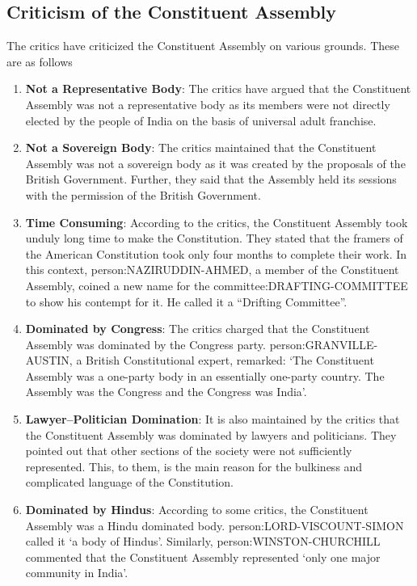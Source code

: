 \begin{multicol}{2}
\section{Criticism of the Constituent Assembly}

The critics have criticized the Constituent Assembly on various grounds. These are as follows

\begin{enumerate}
  \item \textbf{Not a Representative Body}: The critics have argued that the Constituent  Assembly was not a representative body as its members were not directly elected by the people of India on the basis of universal adult franchise.
  \item \textbf{Not a Sovereign Body}: The critics maintained that the Constituent Assembly was not a sovereign body as it was created by the proposals of the British Government. Further, they said that the Assembly held its sessions with the permission of the British Government.
  \item \textbf{Time Consuming}: According to the critics, the Constituent Assembly took unduly long time to make the Constitution. They stated that the framers of the American Constitution took only four months to complete their work. In this context, \gls{person:NAZIRUDDIN-AHMED}, a member of the Constituent Assembly, coined a new name for the \gls{committee:DRAFTING-COMMITTEE} to show his contempt for it. He called it a ``Drifting Committee''.
  \item \textbf{Dominated by Congress}: The critics charged that the Constituent Assembly was dominated by the Congress party. \gls{person:GRANVILLE-AUSTIN}, a British Constitutional expert, remarked: `The Constituent Assembly was a one-party body in an essentially one-party country. The Assembly was the Congress and the Congress was India'.
  \item \textbf{Lawyer–Politician Domination}: It is also maintained by the critics that the Constituent Assembly was dominated by lawyers and politicians. They pointed out that other sections of the society were not sufficiently represented. This, to them, is the main reason for the bulkiness and complicated language of the Constitution.
  \item \textbf{Dominated by Hindus}: According to some critics, the Constituent Assembly was a Hindu dominated body. \gls{person:LORD-VISCOUNT-SIMON} called it `a body of Hindus'. Similarly, \gls{person:WINSTON-CHURCHILL} commented that the Constituent Assembly represented `only one major community in India'.
\end{enumerate}



\end{multicol}
